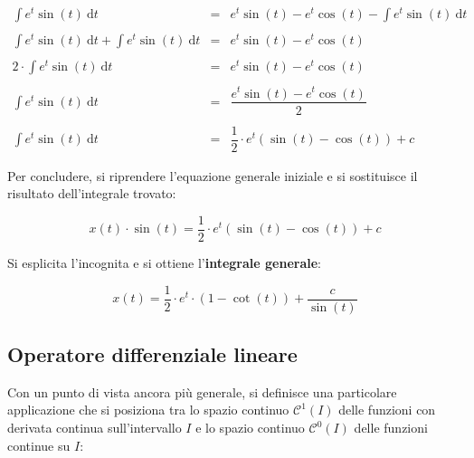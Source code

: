 \documentclass[a4paper]{article}
\begin{document}
	\begin{equation*}
		\begin{array}{lll}
			\displaystyle\int e^{t} \sin\left(t\right) \: \mathrm{d}t	& = & e^{t} \sin\left(t\right) - e^{t} \cos\left(t\right) - \displaystyle\int e^{t} \sin\left(t\right) \: \mathrm{d}t \\
			&& \\
			\displaystyle\int e^{t} \sin\left(t\right) \: \mathrm{d}t + \displaystyle\int e^{t} \sin\left(t\right) \: \mathrm{d}t	& = & e^{t} \sin\left(t\right) - e^{t} \cos\left(t\right) \\
			&& \\
			2 \cdot \displaystyle\int e^{t} \sin\left(t\right) \: \mathrm{d}t & = & e^{t} \sin\left(t\right) - e^{t} \cos\left(t\right) \\
			&& \\
			\displaystyle\int e^{t} \sin\left(t\right) \: \mathrm{d}t 	& = & \dfrac{e^{t} \sin\left(t\right) - e^{t} \cos\left(t\right)}{2} \\
			&& \\
			\displaystyle\int e^{t} \sin\left(t\right) \: \mathrm{d}t 	& = & \dfrac{1}{2} \cdot e^{t} \left(\sin\left(t\right) - \cos\left(t\right)\right) + c
		\end{array}
	\end{equation*}

	\noindent
	Per concludere, si riprendere l'equazione generale iniziale e si sostituisce il risultato dell'integrale trovato:
	
	\begin{equation*}
		x\left(t\right) \cdot \sin\left(t\right) = \dfrac{1}{2} \cdot e^{t} \left(\sin\left(t\right) - \cos\left(t\right)\right) + c
	\end{equation*}

	\noindent
	Si esplicita l'incognita e si ottiene l'\textbf{integrale generale}:
	
	\begin{equation*}
		x\left(t\right) = \dfrac{1}{2} \cdot e^{t} \cdot \left(1 - \cot\left(t\right)\right) + \dfrac{c}{\sin\left(t\right)}
	\end{equation*}

	\newpage
	
	\subsection{Operatore differenziale lineare}
	
	Con un punto di vista ancora più generale, si definisce una particolare applicazione che si posiziona tra lo spazio continuo $\mathcal{C}^{1}\left(I\right)$ delle funzioni con derivata continua sull'intervallo $I$ e lo spazio continuo $\mathcal{C}^{0}\left(I\right)$ delle funzioni continue su $I$:
	
\end{document}
